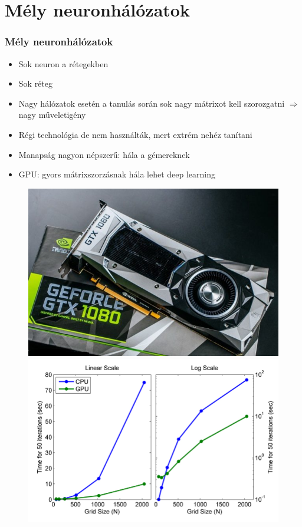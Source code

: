 \documentclass{beamer}
\begin{document}
\section{Mély neuronhálózatok}
\begin{frame}
\frametitle{Mély neuronhálózatok}
\begin{minipage}{0.48\textwidth}

\begin{itemize}
  \setlength{\itemsep}{12pt}
  \item Sok neuron a rétegekben
  \item Sok réteg
  \item Nagy hálózatok esetén a tanulás során sok nagy mátrixot kell szorozgatni $\Rightarrow$ nagy műveletigény
  \item Régi technológia de nem használták, mert extrém nehéz tanítani
  \item Manapság nagyon népszerű: hála a gémereknek
  \item GPU: gyors mátrixszorzásnak hála lehet deep learning
\end{itemize}
\end{minipage}
\begin{minipage}{0.48\textwidth}

\begin{figure}[H]
	\centering
    		\includegraphics[width=\textwidth]{pic/gpu}\\
    		\includegraphics[width=\textwidth]{pic/gpu2}
\end{figure}
\end{minipage}
\end{frame}
\end{document}
